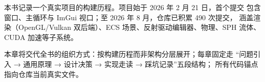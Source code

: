 本书记录一个真实项目的构建历程。项目始于 2026 年 2 月 21 日，首个提交
包含窗口、主循环与 ImGui 视口；至 2026 年 8 月，仓库已积累 490 次提交，
涵盖渲染（OpenGL/Vulkan 双后端）、ECS 场景、反射驱动编辑器、物理、SPH
流体、CUDA 加速等子系统。

本章将交代全书的组织方式：按构建历程而非架构分层展开；每章固定走
``问题引入 → 通用原理 → 设计决策 → 实现走读 → 踩坑记录''五段结构；
所有代码锚点指向仓库当前真实文件。


